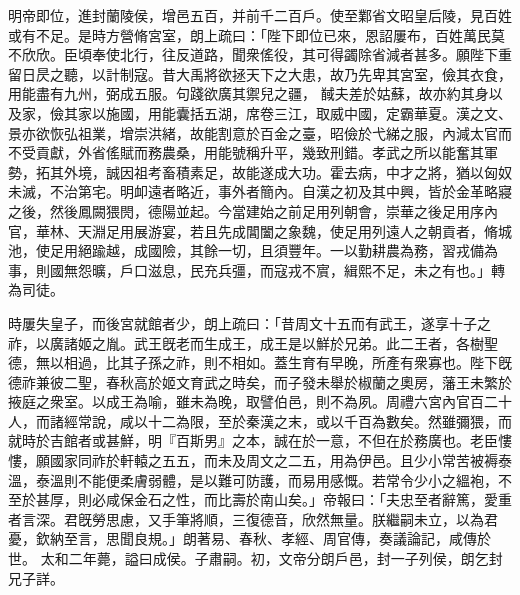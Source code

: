 \begin{pinyinscope}
明帝即位，進封蘭陵侯，增邑五百，并前千二百戶。使至鄴省文昭皇后陵，見百姓或有不足。是時方營脩宮室，朗上疏曰：「陛下即位已來，恩詔屢布，百姓萬民莫不欣欣。臣頃奉使北行，往反道路，聞衆傜役，其可得蠲除省減者甚多。願陛下重留日昃之聽，以計制寇。昔大禹將欲拯天下之大患，故乃先卑其宮室，儉其衣食，用能盡有九州，弼成五服。句踐欲廣其禦兒之疆，
馘夫差於姑蘇，故亦約其身以及家，儉其家以施國，用能囊括五湖，席卷三江，取威中國，定霸華夏。漢之文、景亦欲恢弘祖業，增崇洪緒，故能割意於百金之臺，昭儉於弋綈之服，內減太官而不受貢獻，外省傜賦而務農桑，用能號稱升平，幾致刑錯。孝武之所以能奮其軍勢，拓其外境，誠因祖考畜積素足，故能遂成大功。霍去病，中才之將，猶以匈奴未滅，不治第宅。明卹遠者略近，事外者簡內。自漢之初及其中興，皆於金革略寢之後，然後鳳闕猥閌，德陽並起。今當建始之前足用列朝會，崇華之後足用序內官，華林、天淵足用展游宴，若且先成閶闔之象魏，使足用列遠人之朝貢者，脩城池，使足用絕踰越，成國險，其餘一切，且須豐年。一以勤耕農為務，習戎備為事，則國無怨曠，戶口滋息，民充兵彊，而寇戎不賔，緝熙不足，未之有也。」轉為司徒。


時屢失皇子，而後宮就館者少，朗上疏曰：「昔周文十五而有武王，遂享十子之祚，以廣諸姬之胤。武王旣老而生成王，成王是以鮮於兄弟。此二王者，各樹聖德，無以相過，比其子孫之祚，則不相如。蓋生育有早晚，所產有衆寡也。陛下旣德祚兼彼二聖，春秋高於姬文育武之時矣，而子發未舉於椒蘭之奧房，藩王未繁於掖庭之衆室。以成王為喻，雖未為晚，取譬伯邑，則不為夙。周禮六宮內官百二十人，而諸經常說，咸以十二為限，至於秦漢之末，或以千百為數矣。然雖彌猥，而就時於吉館者或甚鮮，明『百斯男』之本，誠在於一意，不但在於務廣也。老臣慺慺，願國家同祚於軒轅之五五，而未及周文之二五，用為伊邑。且少小常苦被褥泰溫，泰溫則不能便柔膚弱體，是以難可防護，而易用感慨。若常令少小之縕袍，不至於甚厚，則必咸保金石之性，而比壽於南山矣。」帝報曰：「夫忠至者辭篤，愛重者言深。君旣勞思慮，又手筆將順，三復德音，欣然無量。朕繼嗣未立，以為君憂，欽納至言，思聞良規。」朗著易、春秋、孝經、周官傳，奏議論記，咸傳於世。
太和二年薨，謚曰成侯。子肅嗣。初，文帝分朗戶邑，封一子列侯，朗乞封兄子詳。



\end{pinyinscope}
